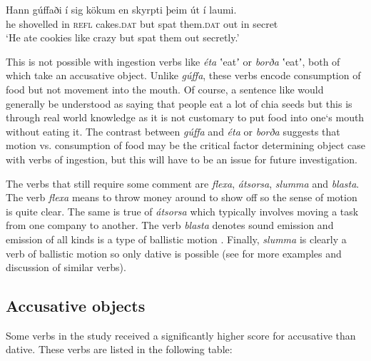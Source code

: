 \documentclass[output=paper,modfonts,nonflat,colorlinks,citecolor=brown]{langsci/langscibook}
\begin{document}
{ 
\ea%
    \label{ex:jonsson:4}
\gll     Hann   gúffaði   í   sig   kökum   en   skyrpti   þeim   út   í    laumi.\\
  he   shovelled   in   \textsc{refl}   cakes.\textsc{dat}   but   spat   them\textsc{.dat}   out   in   secret\\
\glt `He ate cookies like crazy but spat them out secretly.'
\z

This is not possible with ingestion verbs like \textit{éta} ʽeatʼ or \textit{borða} ʽeatʼ, both of which take an accusative object. Unlike \textit{gúffa}, these verbs encode consumption of food but not movement into the mouth. Of course, a sentence like  would generally be understood as saying that people eat a lot of chia seeds but this is through real world knowledge as it is not customary to put food into one‘s mouth without eating it. The contrast between \textit{gúffa} and \textit{éta} or \textit{borða} suggests that motion vs. consumption of food may be the critical factor determining object case with verbs of ingestion, but this will have to be an issue for future investigation.

The verbs that still require some comment are \textit{flexa}, \textit{átsorsa}, \textit{slumma} and \textit{blasta}. The verb \textit{flexa} means to throw money around to show off so the sense of motion is quite clear. The same is true of \textit{átsorsa} which typically involves moving a task from one company to another. The verb \textit{blasta} denotes sound emission and emission of all kinds is a type of ballistic motion \citep{Jónsson2013a}. Finally, \textit{slumma} is clearly a verb of ballistic motion so only dative is possible (see \citealt{Jónsson2013a} for more examples and discussion of similar verbs).

\subsection{Accusative objects} %

Some verbs in the study received a significantly higher score for accusative than dative. These verbs are listed in the following table:  

}
\end{document}

